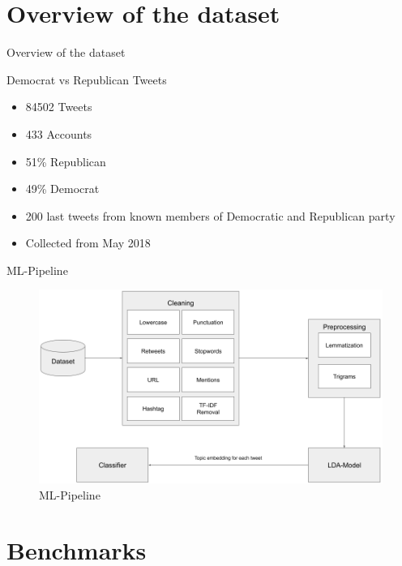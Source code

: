 \documentclass[aspectratio=169,xcolor=dvipsnames]{beamer}
\begin{document}
\section{Overview of the dataset}

\begin{frame}{Overview of the dataset}
    \begin{block}{Democrat vs Republican Tweets}
        \begin{itemize}
            \item 84502 Tweets
            \item 433 Accounts
            \item 51\% Republican
            \item 49\% Democrat
            \item 200 last tweets from known members of Democratic and Republican party
            \item Collected from May 2018
        \end{itemize}
    \end{block}
\end{frame}

\begin{frame}{ML-Pipeline}
    \begin{figure}
        \centering
        \includegraphics[width=.8\textwidth]{images/pipeline.png}
        \caption{ML-Pipeline}
        \label{fig:pipeline}
    \end{figure}
\end{frame}

\section{Benchmarks}
\end{document}
